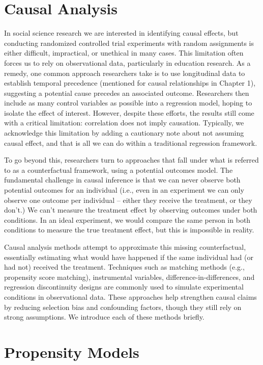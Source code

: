 \documentclass[
  letterpaper,
  DIV=11,
  numbers=noendperiod]{scrreprt}
\begin{document}
\section{Causal Analysis}\label{causal-analysis}

In social science research we are interested in identifying causal
effects, but conducting randomized controlled trial experiments with
random assignments is either difficult, impractical, or unethical in
many cases. This limitation often forces us to rely on observational
data, particularly in education research. As a remedy, one common
approach researchers take is to use longitudinal data to establish
temporal precedence (mentioned for causal relationships in Chapter 1),
suggesting a potential cause precedes an associated outcome. Researchers
then include as many control variables as possible into a regression
model, hoping to isolate the effect of interest. However, despite these
efforts, the results still come with a critical limitation: correlation
does not imply causation. Typically, we acknowledge this limitation by
adding a cautionary note about not assuming causal effect, and that is
all we can do within a traditional regression framework.

To go beyond this, researchers turn to approaches that fall under what
is referred to as a counterfactual framework, using a potential outcomes
model. The fundamental challenge in causal inference is that we can
never observe both potential outcomes for an individual (i.e., even in
an experiment we can only observe one outcome per individual -- either
they receive the treatment, or they don't.) We can't measure the
treatment effect by observing outcomes under both conditions. In an
ideal experiment, we would compare the same person in both conditions to
measure the true treatment effect, but this is impossible in reality.

Causal analysis methods attempt to approximate this missing
counterfactual, essentially estimating what would have happened if the
same individual had (or had not) received the treatment. Techniques such
as matching methods (e.g., propensity score matching), instrumental
variables, difference-in-differences, and regression discontinuity
designs are commonly used to simulate experimental conditions in
observational data. These approaches help strengthen causal claims by
reducing selection bias and confounding factors, though they still rely
on strong assumptions. We introduce each of these methods briefly.

\section{Propensity Models}\label{propensity-models}
\end{document}
